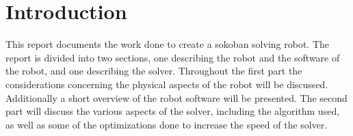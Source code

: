 \section{Introduction}
This report documents the work done to create a sokoban solving robot. 
The report is divided into two sections, one describing the robot and the software of the robot, and one describing the solver.
Throughout the first part the considerations concerning the physical aspects of the robot will be discussed.
Additionally a short overview of the robot software will be presented.
The second part will discuss the various aspects of the solver, including the algorithm used, as well as some of the optimizations done to increase the speed of the solver.